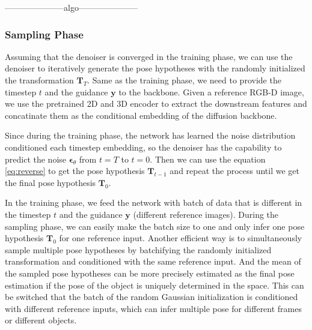 \documentclass[12pt,DIV14,BCOR12mm,a4paper,footinclude=false,headinclude,parskip=half-,twoside,openright,cleardoublepage=empty,toc=index,bibliography=totoc,listof=totoc]{scrreprt}
\numberwithin{equation}{chapter}
\begin{document}
---------------------algo---------------------

\subsubsection{Sampling Phase}
Assuming that the denoiser is converged in the training phase, we can use the denoiser to iteratively generate the pose hypotheses with the randomly initialized the transformation $\mathbf{T}_{T}$. Same as the training phase, we need to provide the timestep $t$ and the guidance $\mathbf{y}$ to the backbone. Given a reference RGB-D image, we use the pretrained 2D and 3D encoder to extract the downstream features and concatinate them as the conditional embedding of the diffusion backbone. 

Since during the training phase, the network has learned the noise distribution conditioned each timestep embedding, so the denoiser has the capability to predict the noise $\boldsymbol{\epsilon}_{\theta}$ from $t=T$ to $t=0$. Then we can use the equation \ref{eq:reverse} to get the pose hypothesis $\mathbf{T}_{t-1}$ and repeat the process until we get the final pose hypothesis $\mathbf{T}_{0}$. 

In the training phase, we feed the network with batch of data that is different in the timestep $t$ and the guidance $\mathbf{y}$ (different reference images). During the sampling phase, we can easily make the batch size to one and only infer one pose hypothesis $\mathbf{T}_{0}$ for one reference input. Another efficient way is to simultaneously sample multiple pose hypotheses by batchifying the randomly initialized transformation and conditioned with the same reference input. And the mean of the sampled pose hypotheses can be more precisely estimated as the final pose estimation if the pose of the object is uniquely determined in the space. This can be switched that the batch of the random Gaussian initialization is conditioned with different reference inputs, which can infer multiple pose for different frames or different objects.
\end{document}
